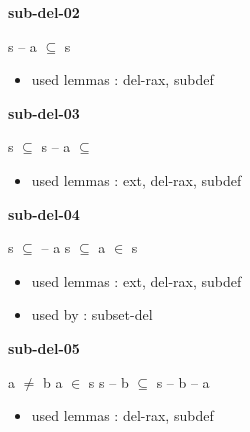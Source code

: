 \documentclass[a4paper]{article}
\begin{document}
\medskip

\bigskip

{\large\bf sub-del-02}

\medskip

 \Fol s -- a $\subseteq$ s

\begin{itemize}


\item       used lemmas  : del-rax, subdef

\end{itemize}

\medskip

\bigskip

{\large\bf sub-del-03}

\medskip

 \Fol s $\subseteq$  \Imp s -- a $\subseteq$ 

\begin{itemize}


\item       used lemmas  : ext, del-rax, subdef

\end{itemize}

\medskip

\bigskip

{\large\bf sub-del-04}

\medskip

 \Fol s $\subseteq$  -- a \Equiv s $\subseteq$  \And \Not a $\in$ s

\begin{itemize}


\item       used lemmas  : ext, del-rax, subdef
\item       used by      : subset-del

\end{itemize}

\medskip

\bigskip

{\large\bf sub-del-05}

\medskip

 \Fol a $\neq$ b \And \Not a $\in$ s \Imp s -- b $\subseteq$ s -- b -- a

\begin{itemize}


\item       used lemmas  : del-rax, subdef

\end{itemize}
\end{document}
